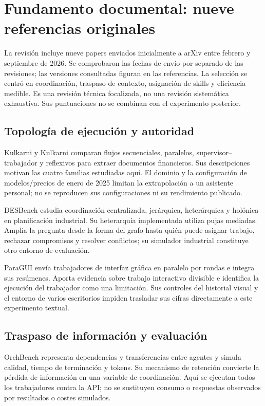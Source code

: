 \section{Fundamento documental: nueve referencias originales}
La revisión incluye nueve papers enviados inicialmente a arXiv entre febrero y septiembre de 2026. Se comprobaron las fechas de envío por separado de las revisiones; las versiones consultadas figuran en las referencias. La selección se centró en coordinación, traspaso de contexto, asignación de skills y eficiencia medible. Es una revisión técnica focalizada, no una revisión sistemática exhaustiva. Sus puntuaciones no se combinan con el experimento posterior.

\subsection{Topología de ejecución y autoridad}
Kulkarni y Kulkarni comparan flujos secuenciales, paralelos, supervisor--trabajador y reflexivos para extraer documentos financieros. Sus descripciones motivan las cuatro familias estudiadas aquí. El dominio y la configuración de modelos/precios de enero de 2025 limitan la extrapolación a un asistente personal; no se reproducen sus configuraciones ni su rendimiento publicado.

DESBench estudia coordinación centralizada, jerárquica, heterárquica y holónica en planificación industrial. Su heterarquía implementada utiliza pujas mediadas. Amplía la pregunta desde la forma del grafo hasta quién puede asignar trabajo, rechazar compromisos y resolver conflictos; su simulador industrial constituye otro entorno de evaluación.

ParaGUI envía trabajadores de interfaz gráfica en paralelo por rondas e integra sus resúmenes. Aporta evidencia sobre trabajo interactivo divisible e identifica la ejecución del trabajador como una limitación. Sus controles del historial visual y el entorno de varios escritorios impiden trasladar sus cifras directamente a este experimento textual.

\subsection{Traspaso de información y evaluación}
OrchBench representa dependencias y transferencias entre agentes y simula calidad, tiempo de terminación y tokens. Su mecanismo de retención convierte la pérdida de información en una variable de coordinación. Aquí se ejecutan todos los trabajadores contra la API; no se sustituyen consumo o respuestas observados por resultados o costes simulados.

